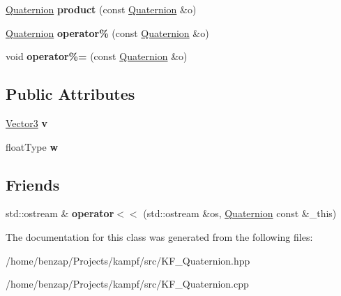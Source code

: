 \begin{DoxyCompactItemize}
\item 
\hypertarget{classQuaternion_af629f7a3e239ee013f16911c686f9e90}{\hyperlink{classQuaternion}{Quaternion} {\bfseries product} (const \hyperlink{classQuaternion}{Quaternion} \&o)}\label{classQuaternion_af629f7a3e239ee013f16911c686f9e90}

\item 
\hypertarget{classQuaternion_a576c7e34fe28ee4478808124b325f3c0}{\hyperlink{classQuaternion}{Quaternion} {\bfseries operator\%} (const \hyperlink{classQuaternion}{Quaternion} \&o)}\label{classQuaternion_a576c7e34fe28ee4478808124b325f3c0}

\item 
\hypertarget{classQuaternion_a628fa0ec258039dcbdcbb6bec0922879}{void {\bfseries operator\%=} (const \hyperlink{classQuaternion}{Quaternion} \&o)}\label{classQuaternion_a628fa0ec258039dcbdcbb6bec0922879}

\end{DoxyCompactItemize}
\subsection*{Public Attributes}
\begin{DoxyCompactItemize}
\item 
\hypertarget{classQuaternion_a16cdaa71e782c10f7398933c346a1587}{\hyperlink{classVector3}{Vector3} {\bfseries v}}\label{classQuaternion_a16cdaa71e782c10f7398933c346a1587}

\item 
\hypertarget{classQuaternion_a4394a257594a42a289ec833d21ddb2cb}{float\-Type {\bfseries w}}\label{classQuaternion_a4394a257594a42a289ec833d21ddb2cb}

\end{DoxyCompactItemize}
\subsection*{Friends}
\begin{DoxyCompactItemize}
\item 
\hypertarget{classQuaternion_acca4fa1f2c48a5730f7c0859a42a3b1b}{std\-::ostream \& {\bfseries operator$<$$<$} (std\-::ostream \&os, \hyperlink{classQuaternion}{Quaternion} const \&\-\_\-this)}\label{classQuaternion_acca4fa1f2c48a5730f7c0859a42a3b1b}

\end{DoxyCompactItemize}


The documentation for this class was generated from the following files\-:\begin{DoxyCompactItemize}
\item 
/home/benzap/\-Projects/kampf/src/K\-F\-\_\-\-Quaternion.\-hpp\item 
/home/benzap/\-Projects/kampf/src/K\-F\-\_\-\-Quaternion.\-cpp\end{DoxyCompactItemize}

